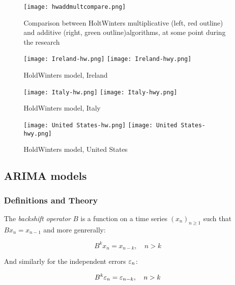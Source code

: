 \begin{figure}[H]
\texttt{[image: hwaddmultcompare.png]}
\endminipage
\caption{Comparison between HoltWinters multiplicative (left, red outline) and additive (right, green outline)algorithms, at some point during the research}
\end{figure}

\begin{figure}[H]
  \texttt{[image: Ireland-hw.png]} \label{fig:ireland-hw}
\endminipage\hfill
{}
  \texttt{[image: Ireland-hwy.png]} \label{fig:ireland-hwy}
\endminipage
\caption{HoldWinters model, Ireland}
\end{figure}

\begin{figure}[H]
  \texttt{[image: Italy-hw.png]} \label{fig:italy-hw}
\endminipage\hfill
{}
  \texttt{[image: Italy-hwy.png]} \label{fig:italy-hwy}
\endminipage
\caption{HoldWinters model, Italy}
\end{figure}

\begin{figure}[H]
  \texttt{[image: United States-hw.png]} \label{fig:usa-hw}
\endminipage\hfill
{}
  \texttt{[image: United States-hwy.png]} \label{fig:usa-hwy}
\endminipage
\caption{HoldWinters model, United States}
\end{figure}


\subsection{ARIMA models}

\subsubsection{Definitions and Theory}

\begin{definition}
The \textit{backshift operator} $B$ is a function on a time series $\left(x_n\right)_{n\geq1}$ such that $Bx_n=x_{n-1}$ and more genrerally:

$$B^k x_n= x_{n-k},\quad n>k$$

And similarly for the independent errors $\varepsilon_n$:

$$B^k \varepsilon_n= \varepsilon_{n-k},\quad n>k$$
\end{definition}

